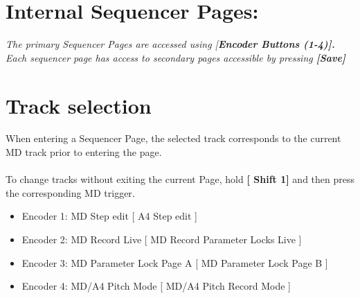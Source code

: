 \section{Internal Sequencer Pages:}
\textit{The primary Sequencer Pages are accessed using [\textbf{Encoder Buttons (1-4)].} Each sequencer page has access to secondary pages accessible by pressing \textbf{[Save]}}

\section{Track selection}
When entering a Sequencer Page, the selected track corresponds to the current MD track prior to entering the page.\\
\\
To change tracks without exiting the current Page, hold \textbf{[ Shift 1]}
and then press the corresponding MD trigger.

\begin{itemize}
	\item Encoder 1: MD Step edit                          [ A4 Step edit ]
	\item Encoder 2: MD Record Live                      [ MD Record Parameter Locks Live ]
	\item Encoder 3: MD Parameter Lock Page A  [ MD Parameter Lock Page B ]
	\item Encoder 4: MD/A4 Pitch Mode                [ MD/A4 Pitch Record Mode ]
\end{itemize}